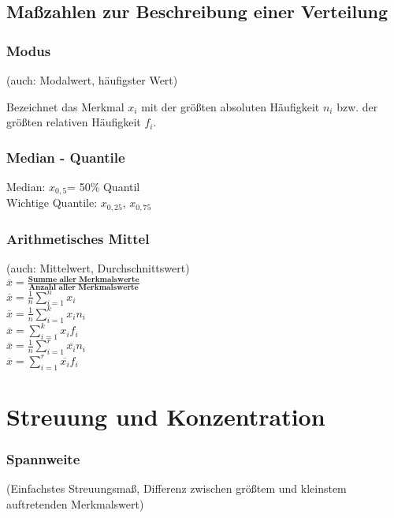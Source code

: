 \documentclass[10pt,a4paper]{article}
\begin{document}
\subsection{Maßzahlen zur Beschreibung einer Verteilung}
\subsubsection{Modus}
(auch: Modalwert, häufigster Wert)

Bezeichnet das Merkmal $x_i$ mit der größten absoluten Häufigkeit $n_i$ bzw. der 
größten relativen Häufigkeit $f_i$.

\subsubsection{Median - Quantile}

Median: $x_{0,5}$= 50\% Quantil\\

Wichtige Quantile: $x_{0,25}$, $x_{0,75}$

\subsubsection{Arithmetisches Mittel}
(auch: Mittelwert, Durchschnittswert)\\

$\overline{x} = \frac{\textbf{Summe aller Merkmalswerte}}{\textbf{Anzahl aller 
Merkmalswerte}}$\\

$\overline{x} = \frac{1}{n} \sum\limits_{i=1}^{n} x_i$\\

$\overline{x} = \frac{1}{n} \sum\limits_{i=1}^{k} x_i n_i$\\

$\overline{x} = \sum\limits_{i=1}^{k} x_i f_i$\\

$\overline{x} = \frac{1}{n} \sum\limits_{i=1}^{r} \overline{x_i} n_i$\\

$\overline{x} = \sum\limits_{i=1}^r \overline{x_i} f_i$\\
\newpage
\section{Streuung und Konzentration}

\subsubsection{Spannweite}
(Einfachstes Streuungsmaß, Differenz zwischen größtem und kleinstem auftretenden 
Merkmalswert)\\
\end{document}
